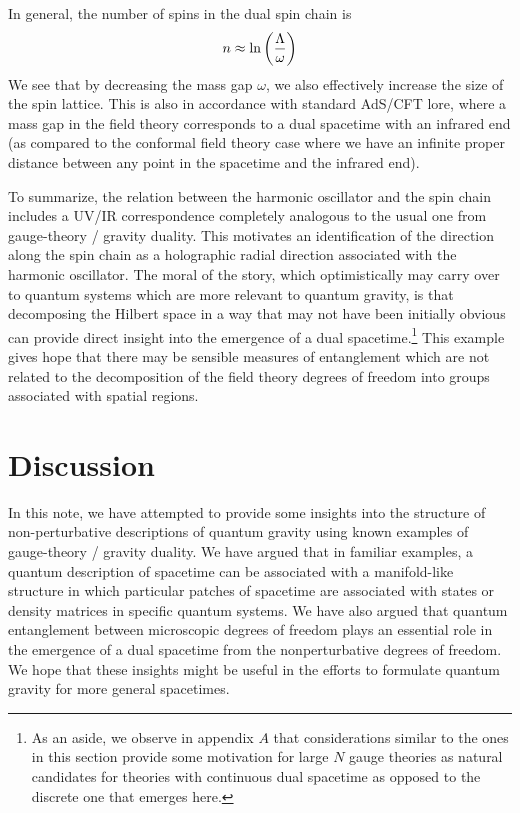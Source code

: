 \documentclass[12pt,epsf]{article}
\renewcommand{\(}{\left(}
\renewcommand{\)}{\right)}
\begin{document}
In general, the number of spins in the dual spin chain is
\begin{equation}
\label{scales}
n \approx \ln \left( {\Lambda \over \omega} \right)
\end{equation}
We see that by decreasing the mass gap $\omega$, we also effectively increase the size of the spin lattice. This is also in accordance with standard AdS/CFT lore, where a mass gap in the field theory corresponds to a dual spacetime with an infrared end (as compared to the conformal field theory case where we have an infinite proper distance between any point in the spacetime and the infrared end).

To summarize, the relation between the harmonic oscillator and the spin chain includes a UV/IR correspondence completely analogous to the usual one from gauge-theory / gravity duality. This motivates an identification of the direction along the spin chain as a holographic radial direction associated with the harmonic oscillator. The moral of the story, which optimistically may carry over to quantum systems which are more relevant to quantum gravity, is that decomposing the Hilbert space in a way that may not have been initially obvious can provide direct insight into the emergence of a dual spacetime.\footnote{As an aside, we observe in appendix $A$ that considerations similar to the ones in this section provide some motivation for large $N$ gauge theories as natural candidates for theories with continuous dual spacetime as opposed to the discrete one that emerges here.} This example gives hope that there may be sensible measures of entanglement which are not related to the decomposition of the field theory degrees of freedom into groups associated with spatial regions.

\section{Discussion}

In this note, we have attempted to provide some insights into the structure of non-perturbative descriptions of quantum gravity using known examples of gauge-theory / gravity duality. We have argued that in familiar examples, a quantum description of spacetime can be associated with a manifold-like structure in which particular patches of spacetime are associated with states or density matrices in specific quantum systems. We have also argued that quantum entanglement between microscopic degrees of freedom plays an essential role in the emergence of a dual spacetime from the nonperturbative degrees of freedom. We hope that these insights might be useful in the efforts to formulate quantum gravity for more general spacetimes.
\end{document}
